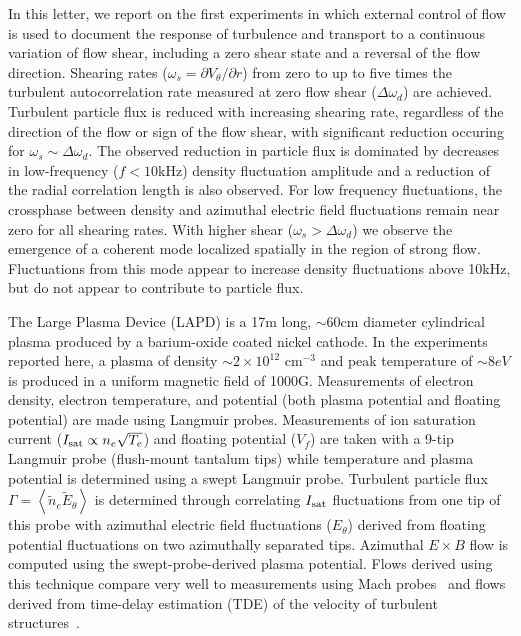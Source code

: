 \documentclass[aps,prl,amsmath,amssymb,preprint,superscriptaddress]{revtex4}
\begin{document}
In this letter, we report on the first experiments in which external
control of flow is used to document the response of turbulence and
transport to a continuous variation of flow shear, including a zero
shear state and a reversal of the flow direction.  
Shearing rates ($\omega_{s}= \partial V_{\theta}/\partial r$) from
zero to up to five times the turbulent autocorrelation rate measured
at zero flow shear ($\Delta \omega_{d}$) are achieved. Turbulent
particle flux is reduced with increasing shearing rate, regardless of the
direction of the flow or sign of the flow shear, with significant
reduction occuring for $\omega_s \sim \Delta \omega_d$.  The observed
reduction in particle flux is dominated by decreases in low-frequency
($f < 10$kHz) density fluctuation amplitude and a reduction of the
radial correlation length is also observed. For low frequency
fluctuations, the crossphase
between density and azimuthal electric field fluctuations remain near
zero for all shearing rates.  With higher shear ($\omega_s > \Delta
\omega_d$) we observe the emergence of a coherent mode localized spatially in the region
of strong flow. Fluctuations from this mode appear to increase density
fluctuations above 10kHz, but do not appear to contribute to particle
flux.   

The Large Plasma Device \cite{gek91} (LAPD) is a 17m long, $\sim 60$cm
diameter cylindrical plasma produced by a barium-oxide coated nickel
cathode. In the experiments reported here, a plasma of density $\sim 2
\times 10^{12}$ cm$^{-3}$ and peak temperature of $\sim 8 eV$ is
produced in a uniform magnetic field of 1000G.  Measurements of 
electron density, electron temperature, and potential (both plasma
potential and floating potential) are made using Langmuir probes.  
Measurements of ion saturation current ($I_{\rm sat} \propto n_e \sqrt{T_e}$) and floating
potential ($V_f$) are taken with a 9-tip Langmuir probe (flush-mount
tantalum tips) while temperature and plasma potential is
determined using a swept Langmuir probe. Turbulent particle flux
$\Gamma = \left<\tilde{n}_e \tilde{E}_\theta\right>$ is
determined through correlating $I_{\rm sat}$ fluctuations from one tip
of this probe with
azimuthal electric field fluctuations ($E_\theta$) derived from
floating potential fluctuations on two azimuthally separated tips.
Azimuthal $E\times B$ flow is computed
using the swept-probe-derived plasma potential.  Flows derived using
this technique compare very well to measurements using
Mach probes~\cite{maggs07} and flows derived from time-delay
estimation (TDE) of the velocity of turbulent structures~\cite{}.
  
\end{document}
